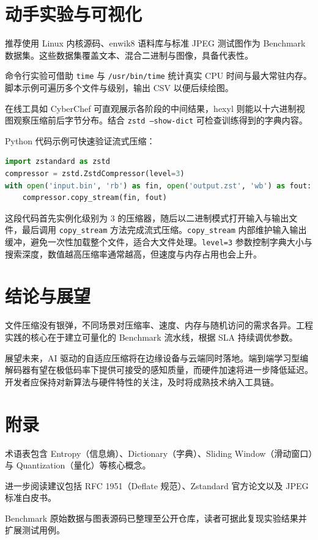 \chapter{动手实验与可视化}
推荐使用 Linux 内核源码、enwik8 语料库与标准 JPEG 测试图作为 Benchmark 数据集。这些数据集覆盖文本、混合二进制与图像，具备代表性。\par
命令行实验可借助 \texttt{time} 与 \texttt{/usr/bin/time} 统计真实 CPU 时间与最大常驻内存。脚本示例可遍历多个文件与级别，输出 CSV 以便后续绘图。\par
在线工具如 CyberChef 可直观展示各阶段的中间结果，hexyl 则能以十六进制视图观察压缩前后字节分布。结合 \texttt{zstd --show-dict} 可检查训练得到的字典内容。\par
Python 代码示例可快速验证流式压缩：\par
\begin{lstlisting}[language=python]
import zstandard as zstd
compressor = zstd.ZstdCompressor(level=3)
with open('input.bin', 'rb') as fin, open('output.zst', 'wb') as fout:
    compressor.copy_stream(fin, fout)
\end{lstlisting}
这段代码首先实例化级别为 3 的压缩器，随后以二进制模式打开输入与输出文件，最后调用 \texttt{copy\_{}stream} 方法完成流式压缩。\texttt{copy\_{}stream} 内部维护输入输出缓冲，避免一次性加载整个文件，适合大文件处理。\texttt{level=3} 参数控制字典大小与搜索深度，数值越高压缩率通常越高，但速度与内存占用也会上升。\par
\chapter{结论与展望}
文件压缩没有银弹，不同场景对压缩率、速度、内存与随机访问的需求各异。工程实践的核心在于建立可量化的 Benchmark 流水线，根据 SLA 持续调优参数。\par
展望未来，AI 驱动的自适应压缩将在边缘设备与云端同时落地。端到端学习型编解码器有望在极低码率下提供可接受的感知质量，而硬件加速将进一步降低延迟。开发者应保持对新算法与硬件特性的关注，及时将成熟技术纳入工具链。\par
\chapter{附录}
术语表包含 Entropy（信息熵）、Dictionary（字典）、Sliding Window（滑动窗口）与 Quantization（量化）等核心概念。\par
进一步阅读建议包括 RFC 1951（Deflate 规范）、Zstandard 官方论文以及 JPEG 标准白皮书。\par
Benchmark 原始数据与图表源码已整理至公开仓库，读者可据此复现实验结果并扩展测试用例。\par
